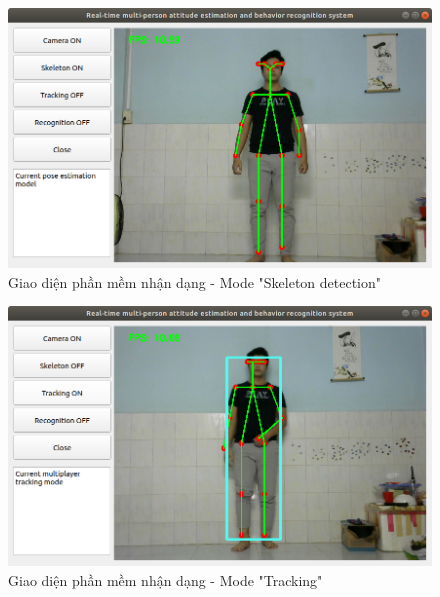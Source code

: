 \FloatBarrier
\begin{figure}[htp]
\begin{center}
\includegraphics[scale=0.5]{chap6/c6_figs/mode_skeleton.png}
\end{center}
\caption{Giao diện phần mềm nhận dạng - Mode "Skeleton detection"}
\label{fig:gui1}
\end{figure}

\begin{figure}[htp]
\begin{center}
\includegraphics[scale=0.5]{chap6/c6_figs/mode_tracking.png}
\end{center}
\caption{Giao diện phần mềm nhận dạng - Mode "Tracking"}
\label{fig:gui2}
\end{figure}

